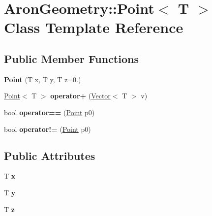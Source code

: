 \hypertarget{class_aron_geometry_1_1_point}{}\section{Aron\+Geometry\+:\+:Point$<$ T $>$ Class Template Reference}
\label{class_aron_geometry_1_1_point}
\subsection*{Public Member Functions}
\begin{DoxyCompactItemize}
\item 
\mbox{\label{class_aron_geometry_1_1_point_a3438f57e0995c529fef23321deeff8f1}} 
{\bfseries Point} (T x, T y, T z=0.)
\item 
\mbox{\label{class_aron_geometry_1_1_point_adc8d81988b0f019ca97f59b06beb3a20}} 
\mbox{\hyperlink{class_aron_geometry_1_1_point}{Point}}$<$ T $>$ {\bfseries operator+} (\mbox{\hyperlink{class_aron_geometry_1_1_vector}{Vector}}$<$ T $>$ v)
\item 
\mbox{\label{class_aron_geometry_1_1_point_a78428a1f9cb6f510cc487aa285d89329}} 
bool {\bfseries operator==} (\mbox{\hyperlink{class_aron_geometry_1_1_point}{Point}} p0)
\item 
\mbox{\label{class_aron_geometry_1_1_point_a9a35912258a4231d577d737806dab5ee}} 
bool {\bfseries operator!=} (\mbox{\hyperlink{class_aron_geometry_1_1_point}{Point}} p0)
\end{DoxyCompactItemize}
\subsection*{Public Attributes}
\begin{DoxyCompactItemize}
\item 
\mbox{\label{class_aron_geometry_1_1_point_a67828202f48623460d22f9180ba3ee7c}} 
T {\bfseries x}
\item 
\mbox{\label{class_aron_geometry_1_1_point_acd404e059ee2b5e379c52706754ba183}} 
T {\bfseries y}
\item 
\mbox{\label{class_aron_geometry_1_1_point_a918a20d03ad9f09c6992863f204bd4eb}} 
T {\bfseries z}
\end{DoxyCompactItemize}
